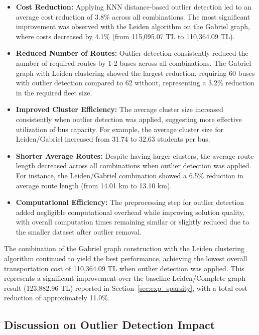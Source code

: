\begin{itemize}
    \item \textbf{Cost Reduction:} Applying KNN distance-based outlier detection led to an average cost reduction of 3.8\% across all combinations. The most significant improvement was observed with the Leiden algorithm on the Gabriel graph, where costs decreased by 4.1\% (from 115,095.07 TL to 110,364.09 TL).
    
    \item \textbf{Reduced Number of Routes:} Outlier detection consistently reduced the number of required routes by 1-2 buses across all combinations. The Gabriel graph with Leiden clustering showed the largest reduction, requiring 60 buses with outlier detection compared to 62 without, representing a 3.2\% reduction in the required fleet size.
    
    \item \textbf{Improved Cluster Efficiency:} The average cluster size increased consistently when outlier detection was applied, suggesting more effective utilization of bus capacity. For example, the average cluster size for Leiden/Gabriel increased from 31.74 to 32.63 students per bus.
    
    \item \textbf{Shorter Average Routes:} Despite having larger clusters, the average route length decreased across all combinations when outlier detection was applied. For instance, the Leiden/Gabriel combination showed a 6.5\% reduction in average route length (from 14.01 km to 13.10 km).
    
    \item \textbf{Computational Efficiency:} The preprocessing step for outlier detection added negligible computational overhead while improving solution quality, with overall computation times remaining similar or slightly reduced due to the smaller dataset after outlier removal.
\end{itemize}

The combination of the Gabriel graph construction with the Leiden clustering algorithm continued to yield the best performance, achieving the lowest overall transportation cost of 110,364.09 TL when outlier detection was applied. This represents a significant improvement over the baseline Leiden/Complete graph result (123,882.96 TL) reported in Section~\ref{sec:exp_sparsity}, with a total cost reduction of approximately 11.0\%.

\subsection{Discussion on Outlier Detection Impact}
\label{subsec:outlier_discussion}

